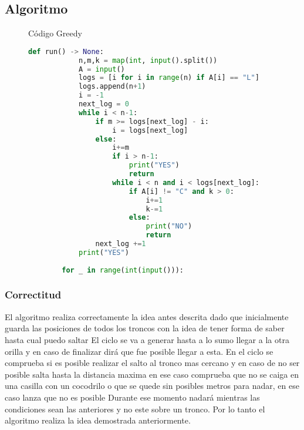 \documentclass{article}
\begin{document}
\subsection{Algoritmo}

\begin{figure}[H]
    \centering
    \begin{description}
        \item[Código Greedy] 
    \end{description}
    \begin{lstlisting}[language=Python]
        def run() -> None:
            n,m,k = map(int, input().split())
            A = input()
            logs = [i for i in range(n) if A[i] == "L"]
            logs.append(n+1)
            i = -1
            next_log = 0
            while i < n-1:
                if m >= logs[next_log] - i:
                    i = logs[next_log]
                else:
                    i+=m
                    if i > n-1:
                        print("YES")
                        return
                    while i < n and i < logs[next_log]:
                        if A[i] != "C" and k > 0:
                            i+=1
                            k-=1
                        else:
                            print("NO")
                            return
                next_log +=1
            print("YES")
     
        for _ in range(int(input())):

    \end{lstlisting}
    
\end{figure}
\subsubsection{Correctitud}
El algoritmo realiza correctamente la idea antes descrita dado que inicialmente guarda las posiciones de todos los troncos
con la idea de tener forma de saber hasta cual puedo saltar 
El ciclo se va a generar hasta a lo sumo llegar a la otra orilla 
y en caso de finalizar dirá que fue posible llegar a esta.
En el ciclo se comprueba si es posible realizar el salto al tronco mas cercano
y en caso de no ser posible salta hasta la distancia maxima en ese caso
comprueba que no se caiga en una casilla con un cocodrilo o que 
se quede sin posibles metros para nadar, en ese caso lanza que no es posible
Durante ese momento nadará mientras las condiciones sean las anteriores y no este sobre un tronco.
Por lo tanto el algoritmo realiza la idea demostrada anteriormente.
\end{document}
